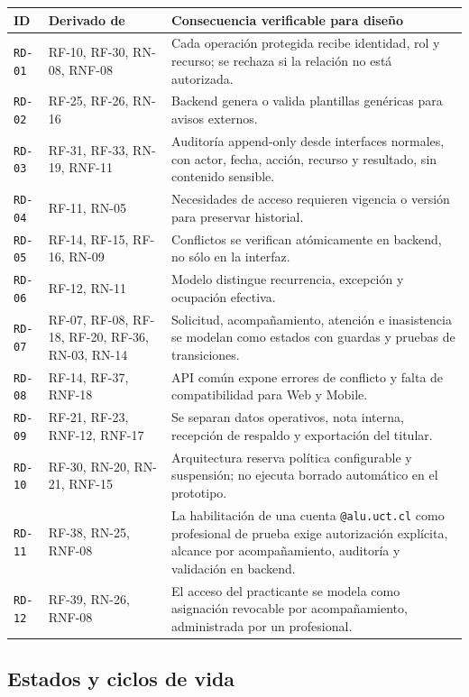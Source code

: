 \documentclass[10pt,a4paper,oneside]{article}
\newcommand{\id}[1]{\texttt{#1}}
\begin{document}
\small
\begin{tabularx}{\textwidth}{@{}L{0.12\textwidth}L{0.31\textwidth}Y@{}}
\toprule
\textbf{ID} & \textbf{Derivado de} & \textbf{Consecuencia verificable para diseño}\\
\midrule
\id{RD-01} & RF-10, RF-30, RN-08, RNF-08 & Cada operación protegida recibe identidad, rol y recurso; se rechaza si la relación no está autorizada.\\
\id{RD-02} & RF-25, RF-26, RN-16 & Backend genera o valida plantillas genéricas para avisos externos.\\
\id{RD-03} & RF-31, RF-33, RN-19, RNF-11 & Auditoría append-only desde interfaces normales, con actor, fecha, acción, recurso y resultado, sin contenido sensible.\\
\id{RD-04} & RF-11, RN-05 & Necesidades de acceso requieren vigencia o versión para preservar historial.\\
\id{RD-05} & RF-14, RF-15, RF-16, RN-09 & Conflictos se verifican atómicamente en backend, no sólo en la interfaz.\\
\id{RD-06} & RF-12, RN-11 & Modelo distingue recurrencia, excepción y ocupación efectiva.\\
\id{RD-07} & RF-07, RF-08, RF-18, RF-20, RF-36, RN-03, RN-14 & Solicitud, acompañamiento, atención e inasistencia se modelan como estados con guardas y pruebas de transiciones.\\
\id{RD-08} & RF-14, RF-37, RNF-18 & API común expone errores de conflicto y falta de compatibilidad para Web y Mobile.\\
\id{RD-09} & RF-21, RF-23, RNF-12, RNF-17 & Se separan datos operativos, nota interna, recepción de respaldo y exportación del titular.\\
\id{RD-10} & RF-30, RN-20, RN-21, RNF-15 & Arquitectura reserva política configurable y suspensión; no ejecuta borrado automático en el prototipo.\\
\id{RD-11} & RF-38, RN-25, RNF-08 & La habilitación de una cuenta \texttt{@alu.uct.cl} como profesional de prueba exige autorización explícita, alcance por acompañamiento, auditoría y validación en backend.\\
\id{RD-12} & RF-39, RN-26, RNF-08 & El acceso del practicante se modela como asignación revocable por acompañamiento, administrada por un profesional.\\
\bottomrule
\end{tabularx}
\normalsize

\subsection{Estados y ciclos de vida}
\end{document}
